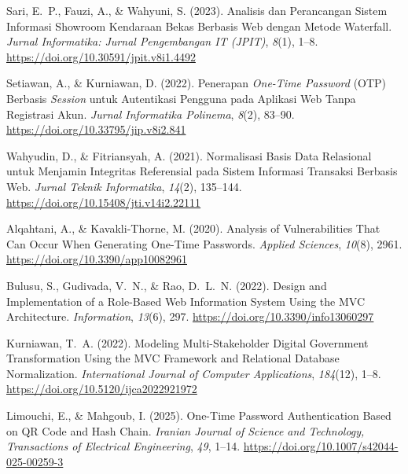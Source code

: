 \documentclass[11pt, a5paper]{article}
\begin{document}
\begin{enumerate}[label={[\arabic*]}, leftmargin=*, itemsep=8pt]
  \item %
        Sari, E.~P., Fauzi, A., \& Wahyuni, S. (2023).
        Analisis dan Perancangan Sistem Informasi Showroom
        Kendaraan Bekas Berbasis Web dengan Metode Waterfall.
        \textit{Jurnal Informatika: Jurnal Pengembangan IT
        (JPIT)}, \textit{8}(1), 1--8.
        \url{https://doi.org/10.30591/jpit.v8i1.4492}

  \item %
        Setiawan, A., \& Kurniawan, D. (2022).
        Penerapan \textit{One-Time Password} (OTP) Berbasis
        \textit{Session} untuk Autentikasi Pengguna pada Aplikasi
        Web Tanpa Registrasi Akun.
        \textit{Jurnal Informatika Polinema}, \textit{8}(2),
        83--90.
        \url{https://doi.org/10.33795/jip.v8i2.841}

  \item %
        Wahyudin, D., \& Fitriansyah, A. (2021).
        Normalisasi Basis Data Relasional untuk Menjamin
        Integritas Referensial pada Sistem Informasi Transaksi
        Berbasis Web.
        \textit{Jurnal Teknik Informatika}, \textit{14}(2),
        135--144.
        \url{https://doi.org/10.15408/jti.v14i2.22111}


  \item %
        Alqahtani, A., \& Kavakli-Thorne, M. (2020).
        Analysis of Vulnerabilities That Can Occur When Generating
        One-Time Passwords.
        \textit{Applied Sciences}, \textit{10}(8), 2961.
        \url{https://doi.org/10.3390/app10082961}

  \item %
        Bulusu, S., Gudivada, V.~N., \& Rao, D.~L.~N. (2022).
        Design and Implementation of a Role-Based Web Information
        System Using the MVC Architecture.
        \textit{Information}, \textit{13}(6), 297.
        \url{https://doi.org/10.3390/info13060297}

  \item %
        Kurniawan, T.~A. (2022).
        Modeling Multi-Stakeholder Digital Government Transformation
        Using the MVC Framework and Relational Database Normalization.
        \textit{International Journal of Computer Applications},
        \textit{184}(12), 1--8.
        \url{https://doi.org/10.5120/ijca2022921972}

  \item %
        Limouchi, E., \& Mahgoub, I. (2025).
        One-Time Password Authentication Based on QR Code and
        Hash Chain.
        \textit{Iranian Journal of Science and Technology,
        Transactions of Electrical Engineering}, \textit{49}, 1--14.
        \url{https://doi.org/10.1007/s42044-025-00259-3}


\end{enumerate}
\end{document}
